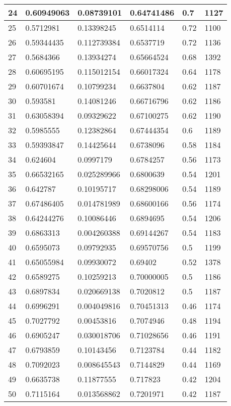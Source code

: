 \begin{longtable}{|l|l|l|l|l|l|}
24 & 0.60949063 & 0.08739101 & 0.64741486 & 0.7 & 1127 \\ \hline 
25 & 0.5712981 & 0.13398245 & 0.6514114 & 0.72 & 1100 \\ \hline 
26 & 0.59344435 & 0.112739384 & 0.6537719 & 0.72 & 1136 \\ \hline 
27 & 0.5684366 & 0.13934274 & 0.65664524 & 0.68 & 1392 \\ \hline 
28 & 0.60695195 & 0.115012154 & 0.66017324 & 0.64 & 1178 \\ \hline 
29 & 0.60701674 & 0.10799234 & 0.6637804 & 0.62 & 1187 \\ \hline 
30 & 0.593581 & 0.14081246 & 0.66716796 & 0.62 & 1186 \\ \hline 
31 & 0.63058394 & 0.09329622 & 0.67100275 & 0.62 & 1190 \\ \hline 
32 & 0.5985555 & 0.12382864 & 0.67444354 & 0.6 & 1189 \\ \hline 
33 & 0.59393847 & 0.14425644 & 0.6738096 & 0.58 & 1184 \\ \hline 
34 & 0.624604 & 0.0997179 & 0.6784257 & 0.56 & 1173 \\ \hline 
35 & 0.66532165 & 0.025289966 & 0.6800639 & 0.54 & 1201 \\ \hline 
36 & 0.642787 & 0.10195717 & 0.68298006 & 0.54 & 1189 \\ \hline 
37 & 0.67486405 & 0.014781989 & 0.68600166 & 0.56 & 1174 \\ \hline 
38 & 0.64244276 & 0.10086446 & 0.6894695 & 0.54 & 1206 \\ \hline 
39 & 0.6863313 & 0.004260388 & 0.69144267 & 0.54 & 1183 \\ \hline 
40 & 0.6595073 & 0.09792935 & 0.69570756 & 0.5 & 1199 \\ \hline 
41 & 0.65055984 & 0.09930072 & 0.69402 & 0.52 & 1378 \\ \hline 
42 & 0.6589275 & 0.10259213 & 0.70000005 & 0.5 & 1186 \\ \hline 
43 & 0.6897834 & 0.020669138 & 0.7020812 & 0.5 & 1187 \\ \hline 
44 & 0.6996291 & 0.004049816 & 0.70451313 & 0.46 & 1174 \\ \hline 
45 & 0.7027792 & 0.00453816 & 0.7074946 & 0.48 & 1194 \\ \hline 
46 & 0.6905247 & 0.030018706 & 0.71028656 & 0.46 & 1191 \\ \hline 
47 & 0.6793859 & 0.10143456 & 0.7123784 & 0.44 & 1182 \\ \hline 
48 & 0.7092023 & 0.008645543 & 0.7144829 & 0.44 & 1169 \\ \hline 
49 & 0.6635738 & 0.11877555 & 0.717823 & 0.42 & 1204 \\ \hline 
50 & 0.7115164 & 0.013568862 & 0.7201971 & 0.42 & 1187 \\ \hline 
\end{longtable}